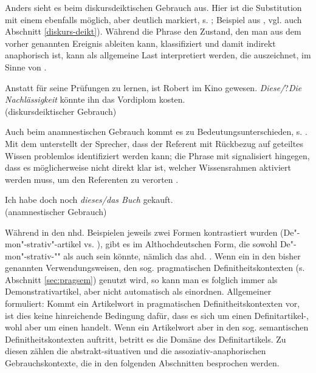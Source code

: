 Anders sieht es beim diskursdeiktischen  Gebrauch aus. Hier ist die Substitution mit einem  ebenfalls möglich, aber deutlich markiert, s. ; Beispiel aus \textcite[95]{Marx2011}, vgl. auch Abschnitt \ref{diskurs-deikt}). Während die Phrase   den Zustand, den man aus dem vorher genannten Ereignis ableiten kann, klassifiziert und damit indirekt anaphorisch   ist, kann  als allgemeine Last interpretiert werden, die  auszeichnet, im Sinne von .

\begin{exe}
	\ex \label{ex:diskurs-deikt-def}  Anstatt für seine Prüfungen zu lernen, ist Robert im Kino gewesen. \textit{Diese\slash}?\textit{Die Nachlässigkeit} könnte ihn das Vordiplom kosten. \\(diskursdeiktischer Gebrauch)
	 \end{exe}

Auch beim anamnestischen  Gebrauch kommt es zu Bedeutungsunterschieden, s. . Mit dem  unterstellt der Sprecher,  dass der Referent mit Rückbezug auf geteiltes Wissen problemlos identifiziert werden kann; die Phrase  mit  signalisiert hingegen, dass es möglicherweise nicht direkt klar ist, welcher Wissensrahmen aktiviert werden muss, um den Referenten zu verorten \parencite[79--80]{Bisle-Muller1991}. 
 
\begin{exe}
	\ex \label{ex:anamndef} Ich habe doch noch \textit{dieses/das Buch} gekauft. \\ (anamnestischer Gebrauch)
\end{exe}
 
Während in den nhd. Beispielen jeweils zwei Formen kontrastiert wurden (De"-mon"-strativ"-artikel   vs.  ), gibt es im Althochdeutschen  Form, die sowohl De"-mon"-strativ-""  als auch  sein könnte, nämlich das ahd. . 
Wenn ein   in den bisher genannten Verwendungsweisen, den sog. pragmatischen  Definitheitskontexten (s. Abschnitt \ref{sec:pragsem}) genutzt wird, so kann man es folglich immer als Demonstrativartikel, aber nicht automatisch als  einordnen. Allgemeiner formuliert: Kommt ein Artikelwort in pragmatischen Definitheitskontexten  vor, ist dies keine  hinreichende Bedingung dafür, dass es sich um einen Definitartikel-, wohl aber um einen  handelt. Wenn ein Artikelwort aber in den sog. semantischen Definitheitskontexten  auftritt, betritt es die Domäne des Definitartikels. Zu diesen zählen die abstrakt-situativen  und die assoziativ-anaphorischen  Gebrauchskontexte, die in den folgenden Abschnitten besprochen werden. 



